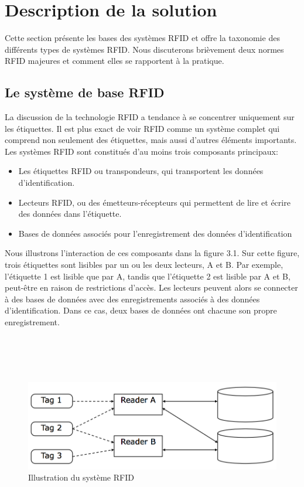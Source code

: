 \documentclass[11pt, a4paper, twoside]{book}
\begin{document}
\section{Description de la solution}
Cette section présente les bases des systèmes RFID et offre la taxonomie des différents types de systèmes RFID. Nous discuterons brièvement deux normes RFID majeures et comment elles se rapportent à la pratique.
\subsection{Le système de base RFID}
La discussion de la technologie RFID a tendance à se concentrer uniquement sur les étiquettes. Il est plus exact de voir RFID comme un système complet qui comprend non seulement des étiquettes, mais aussi d'autres éléments importants. Les systèmes RFID sont constitués d'au moins trois composants principaux:
\begin{itemize}
\item Les étiquettes RFID ou transpondeurs, qui transportent les données d'identification.
\item Lecteurs RFID, ou des émetteurs-récepteurs qui permettent de lire et écrire des données dans l'étiquette.
\item Bases de données associés pour l'enregistrement des données d'identification\\
\end{itemize}

Nous illustrons l'interaction de ces composants dans la figure 3.1. Sur cette figure, trois étiquettes sont lisibles par un ou les deux lecteurs, A et B. Par exemple, l'étiquette 1 est lisible que par A, tandis que l'étiquette 2 est lisible par A et B, peut-être en raison de restrictions d'accès. Les lecteurs peuvent alors se connecter à des bases de données avec des enregistrements associés à des données d'identification. Dans ce cas, deux bases de données ont chacune son propre enregistrement.\\\\\\\\\\
\begin{figure}[!h]
\centering
\includegraphics[width=\textwidth]{shema}
\caption{Illustration du système RFID}
\end{figure}
\end{document}
